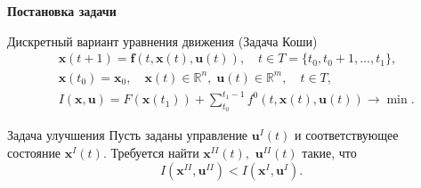\documentclass[10pt]{beamer}
\begin{document}
\begin{frame}{\textbf{Постановка задачи} }
\begin{block}{Дискретный вариант уравнения движения (Задача Коши)}
  \begin{align}
&\mathbf{x}(t+1)=\mathbf{f}(t,\mathbf{x}(t),\mathbf{u}(t)),\quad t \in T=\{t_0,t_0+1,...,t_1\},
	\label{eq100} \\
&\mathbf{x}(t_0)=\mathbf{x}_0,\quad \mathbf{x}(t)\in \mathbb{R}^n,\; \mathbf{u}(t) \in \mathbb{R}^m,\quad t\in T,\label{eq100a} \\
&I(\mathbf{x},\mathbf{u})=F(\mathbf{x}(t_1))+ \sum_{t_0}^{t_1-1}f^0(t,\mathbf{x}(t),\mathbf{u}(t)) \to \min.
  \label{eq103}
  \end{align}
\end{block}
\begin{block}{Задача улучшения}
  Пусть заданы управление $\mathbf{u}^I(t)$ и соответствующее состояние $\mathbf{x}^I(t)$. Требуется найти $\mathbf{x}^{I\!I}(t),$ $\mathbf{u}^{I\!I}(t)$ такие, что
\[
I(\mathbf{x}^{I\!I},\mathbf{u}^{I\!I}) < I(\mathbf{x}^I,\mathbf{u}^I).
\]
 \end{block}
\end{frame}
\def\H{\mathbf{H}}
\def\x{\mathbf{x}}
\def\u{\mathbf{u}}
\def\f{\mathbf{f}}
\def\F{\mathbf{F}}
\def\bpsi{\psi\hspace{-.68em}\psi\hspace{-.68em}\psi}
\end{document}
